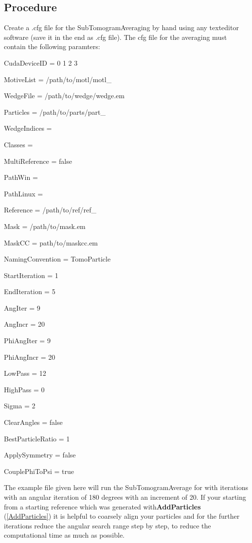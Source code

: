 \documentclass[12pt,a4paper]{scrartcl}
\begin{document}
{\subsection{Procedure}
Create a .cfg file for the SubTomogramAveraging by hand using any texteditor software (save it in the end as .cfg file).
\vspace{1em}
The cfg file for the averaging must contain the following paramters: 
\vspace{1em}
\par CudaDeviceID = 0 1 2 3
\par MotiveList = /path/to/motl/motl\_
\par WedgeFile = /path/to/wedge/wedge.em
\par Particles = /path/to/parts/part\_
\par WedgeIndices = 
\par Classes = 
\par MultiReference = false
\par PathWin =  
\par PathLinux = 
\par Reference = /path/to/ref/ref\_  
\par Mask = /path/to/mask.em
\par MaskCC = path/to/maskcc.em
\par NamingConvention = TomoParticle
\par StartIteration = 1
\par EndIteration = 5
\par AngIter = 9
\par AngIncr = 20
\par PhiAngIter = 9
\par PhiAngIncr = 20
\par LowPass = 12
\par HighPass = 0
\par Sigma = 2
\par ClearAngles = false
\par BestParticleRatio = 1
\par ApplySymmetry = false
\par CouplePhiToPsi = true

\vspace{1em} 
The example file given here will run the SubTomogramAverage for with iterations with an angular iteration of 180 degrees with an increment of 20. If your starting from a starting reference which was generated with\textbf{AddParticles} (\ref{AddParticles}) it is helpful to coarsely align your particles and  for the further iterations reduce the angular search range step by step, to reduce the computational time as much as possible. 

}
\end{document}

